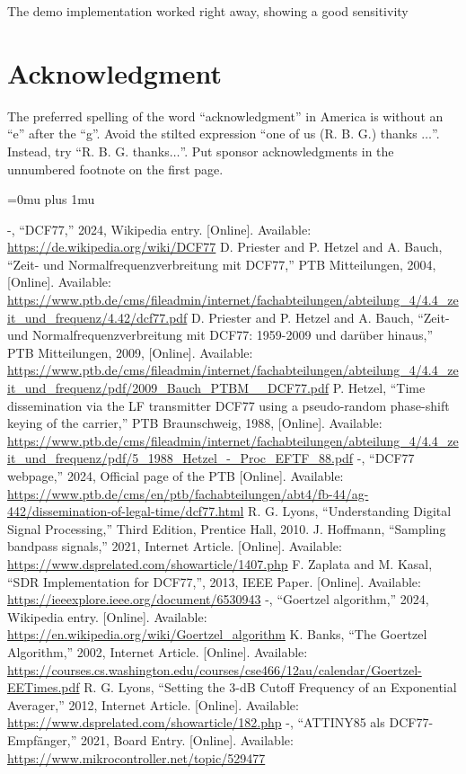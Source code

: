 \documentclass[conference]{IEEEtran}
\begin{document}
The demo implementation worked right away, showing a good sensitivity 



\section*{Acknowledgment}
The preferred spelling of the word ``acknowledgment'' in America is without 
an ``e'' after the ``g''. Avoid the stilted expression ``one of us (R. B. 
G.) thanks $\ldots$''. Instead, try ``R. B. G. thanks$\ldots$''. Put sponsor 
acknowledgments in the unnumbered footnote on the first page.

\Urlmuskip=0mu plus 1mu
\begin{thebibliography}{00}
 -, ``DCF77,'' 2024, Wikipedia entry. [Online]. Available: \url{https://de.wikipedia.org/wiki/DCF77}
 D. Priester and P. Hetzel and A. Bauch, ``Zeit- und Normalfrequenzverbreitung mit DCF77,'' PTB Mitteilungen, 2004, [Online]. Available: \url{https://www.ptb.de/cms/fileadmin/internet/fachabteilungen/abteilung_4/4.4_zeit_und_frequenz/4.42/dcf77.pdf}
 D. Priester and P. Hetzel and A. Bauch, ``Zeit- und Normalfrequenzverbreitung mit DCF77: 1959-2009 und darüber hinaus,'' PTB Mitteilungen, 2009, [Online]. Available: \url{https://www.ptb.de/cms/fileadmin/internet/fachabteilungen/abteilung_4/4.4_zeit_und_frequenz/pdf/2009_Bauch_PTBM__DCF77.pdf}
 P. Hetzel, ``Time dissemination via the LF transmitter DCF77 using a pseudo-random phase-shift keying of the carrier,'' PTB Braunschweig, 1988, [Online]. Available: \url{https://www.ptb.de/cms/fileadmin/internet/fachabteilungen/abteilung_4/4.4_zeit_und_frequenz/pdf/5_1988_Hetzel_-_Proc_EFTF_88.pdf}
 -, ``DCF77 webpage,'' 2024, Official page of the PTB [Online]. Available: \url{https://www.ptb.de/cms/en/ptb/fachabteilungen/abt4/fb-44/ag-442/dissemination-of-legal-time/dcf77.html}
 R. G. Lyons, ``Understanding Digital Signal Processing,'' Third Edition, Prentice Hall, 2010.
 J. Hoffmann, ``Sampling bandpass signals,'' 2021, Internet Article. [Online]. Available: \url{https://www.dsprelated.com/showarticle/1407.php}
 F. Zaplata and M. Kasal, ``SDR Implementation for DCF77,'', 2013, IEEE Paper. [Online]. Available: \url{https://ieeexplore.ieee.org/document/6530943}
 -, ``Goertzel algorithm,'' 2024, Wikipedia entry. [Online]. Available: \url{https://en.wikipedia.org/wiki/Goertzel_algorithm}
 K. Banks, ``The Goertzel Algorithm,'' 2002, Internet Article. [Online]. Available: \url{https://courses.cs.washington.edu/courses/cse466/12au/calendar/Goertzel-EETimes.pdf}
 R. G. Lyons, ``Setting the 3-dB Cutoff Frequency of an Exponential Averager,'' 2012, Internet Article. [Online]. Available: \url{https://www.dsprelated.com/showarticle/182.php}
 -, ``ATTINY85 als DCF77-Empfänger,'' 2021, Board Entry. [Online]. Available: \url{https://www.mikrocontroller.net/topic/529477}
\end{thebibliography}
\end{document}
